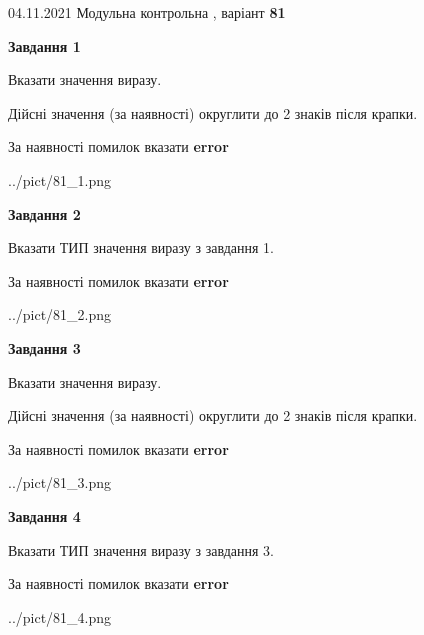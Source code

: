 \documentclass[11pt, ukrainian]{article}
\begin{document}
{04.11.2021 Модульна контрольна , варіант  \No \textbf { 81 }\par}
{
\begin {large}
{\begin {center}\textbf{Завдання 1}\end {center}}\par
Вказати значення виразу. \par
Дійсні значення (за наявності) округлити до 2 знаків після крапки. \par
За наявності помилок вказати \textbf{error}

\begin{center}
	{../pict/81_1.png}
\end{center}
\newpage

{\begin {center}\textbf{Завдання 2}\end {center}}\par
Вказати ТИП значення виразу з завдання 1. \par
За наявності помилок вказати \textbf{error}

\begin{center}
	{../pict/81_2.png}
\end{center}
\newpage

{\begin {center}\textbf{Завдання 3}\end {center}}\par
Вказати значення виразу. \par
Дійсні значення (за наявності) округлити до 2 знаків після крапки. \par
За наявності помилок вказати \textbf{error}

\begin{center}
	{../pict/81_3.png}
\end{center}
\newpage

{\begin {center}\textbf{Завдання 4}\end {center}}\par
Вказати ТИП значення виразу з завдання 3. \par
За наявності помилок вказати \textbf{error}

\begin{center}
	{../pict/81_4.png}
\end{center}
\newpage


\end{large}}
\end{document}
